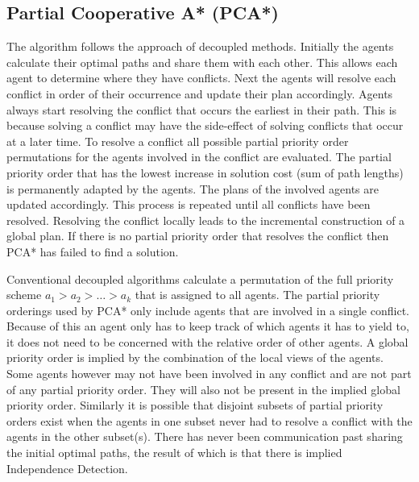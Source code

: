 \subsection{Partial Cooperative A* (PCA*)}
The algorithm follows the approach of decoupled methods. Initially the agents 
calculate their optimal paths and share them with each other. This allows
each agent to determine where they have conflicts. Next the
agents will resolve each conflict in order of their occurrence and update their 
plan accordingly. Agents always start resolving the conflict that occurs the 
earliest in their path. This is because solving a conflict may have the 
side-effect of solving conflicts that occur at a later time. To resolve a 
conflict all possible partial priority order permutations for the agents 
involved in the conflict are evaluated. The partial priority order that has the 
lowest increase in solution cost (sum of path lengths) is permanently adapted 
by the agents. The plans of the involved agents are updated accordingly. This 
process is repeated until all conflicts have been resolved. Resolving the 
conflict locally leads to the incremental construction of a global plan. If 
there is no partial priority order that resolves the conflict then PCA* has 
failed to find a solution.

Conventional decoupled algorithms calculate a permutation of the full priority 
scheme $a_1 > a_2 > \ldots > a_k$ that is assigned to all agents. The partial 
priority orderings used by PCA* only include agents that are involved in a 
single conflict. Because of this an agent only has to keep track of which 
agents it has to yield to, it does not need to be concerned with the 
relative order of other agents. A global priority order is implied by the 
combination of the local views of the agents. Some agents however may not have 
been involved in any conflict and are not part of any partial priority order. 
They will also not be present in the implied global priority order. Similarly 
it is possible that disjoint subsets of partial priority orders exist when the 
agents in one subset never had to resolve a conflict with the agents in the 
other subset(s). There has never been communication past sharing the initial 
optimal paths, the result of which is that there is implied Independence 
Detection.

